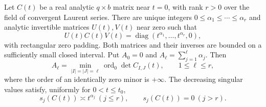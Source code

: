 \begin{lemma}
\label{lem:v19-analytic-orders}
Let $C(t)$ be a real analytic $q\times b$ matrix near $t=0$, with
rank $r>0$ over the field of convergent Laurent series. There are
unique integers $0\le\alpha_1\le\cdots\le\alpha_r$ and analytic
invertible matrices $U(t),V(t)$ near zero such that
\begin{equation}\label{eq:v19-smith}
 U(t)C(t)V(t)=\operatorname{diag}
           (t^{\alpha_1},\ldots,t^{\alpha_r},0),
\end{equation}
with rectangular zero padding. Both matrices and their inverses are
bounded on a sufficiently small closed interval. Put $A_0=0$ and
$A_\ell=\sum_{j=1}^{\ell}\alpha_j$. Then
\begin{equation}\label{eq:v19-minor-orders}
 A_\ell=\min_{|I|=|J|=\ell}
             \operatorname{ord}_0\det C_{I,J}(t),\qquad 1\le\ell\le r,
\end{equation}
where the order of an identically zero minor is $+\infty$.
The decreasing singular values satisfy, uniformly for $0<t\le t_0$,
\begin{equation}\label{eq:v19-singular-orders}
 s_j(C(t))\asymp t^{\alpha_j}\ (j\le r),\qquad
 s_j(C(t))=0\ (j>r).
\end{equation}
\end{lemma}
